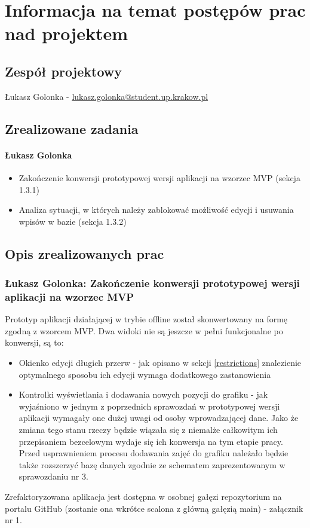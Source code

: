\documentclass[12pt,a4paper,oneside]{article}
\theoremstyle{definition}
\numberwithin{equation}{section}
\begin{document}
\tableofcontents


\newpage

\section{Informacja na temat postępów prac nad projektem}
\subsection{Zespół projektowy}
Łukasz Golonka - \href{mailto:lukasz.golonka@student.up.krakow.pl}{lukasz.golonka@student.up.krakow.pl}
\subsection{Zrealizowane zadania}
\paragraph{Łukasz Golonka}
\begin{itemize}
\item Zakończenie konwersji prototypowej wersji aplikacji na wzorzec MVP (sekcja 1.3.1)
\item Analiza sytuacji, w których należy zablokować możliwość edycji i usuwania wpisów w bazie (sekcja 1.3.2)
\end{itemize}

\subsection {Opis zrealizowanych prac}
\subsubsection{Łukasz Golonka: Zakończenie konwersji prototypowej wersji aplikacji na wzorzec MVP}
Prototyp aplikacji działającej w trybie offline został skonwertowany na formę zgodną z wzorcem MVP.
Dwa widoki nie są jeszcze w pełni funkcjonalne po konwersji, są to:
\begin{itemize}
	\item Okienko edycji długich przerw - jak opisano w sekcji \ref{restrictions} znalezienie optymalnego sposobu ich edycji wymaga dodatkowego zastanowienia
	\item Kontrolki wyświetlania i dodawania nowych pozycji do grafiku - jak wyjaśniono w jednym z poprzednich sprawozdań w prototypowej wersji aplikacji wymagały one dużej uwagi od osoby wprowadzającej dane. Jako że zmiana tego stanu rzeczy będzie wiązała się z niemalże całkowitym ich przepisaniem bezcelowym wydaje się ich konwersja na tym etapie pracy. Przed usprawnieniem procesu dodawania zajęć do grafiku należało będzie także rozszerzyć bazę danych  zgodnie ze schematem zaprezentowanym w sprawozdaniu nr 3.
\end{itemize}
Zrefaktoryzowana aplikacja jest dostępna  w osobnej gałęzi repozytorium na portalu GitHub (zostanie ona wkrótce scalona z  główną gałęzią main) - załącznik nr 1.
\end{document}
